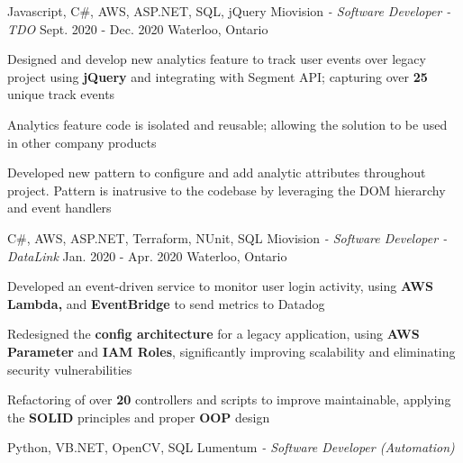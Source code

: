 \begin{siderules}
  \begin{cventries}
    \cventry
    {Javascript, C\#, AWS, ASP.NET, SQL, jQuery}
    {Miovision\hspace{0.15em} \bodyfontlight\itshape{- Software Developer - TDO}}
    {Sept. 2020 - Dec. 2020}
    {Waterloo, Ontario}
    {
      \begin{cvitems}
        \item {Designed and develop new analytics feature to track user events over legacy project using \textbf{jQuery} and integrating with Segment API; capturing over \textbf{25} unique track events}
        \item {Analytics feature code is isolated and reusable; allowing the solution to be used in other company products}
        \item {Developed new pattern to configure and add analytic attributes throughout project. Pattern is inatrusive to the codebase by leveraging the DOM hierarchy and event handlers}
      \end{cvitems}
    }
    \cventry
    {C\#, AWS, ASP.NET, Terraform, NUnit, SQL}
    {Miovision\hspace{0.15em} \bodyfontlight\itshape{- Software Developer - DataLink}}
    {Jan. 2020 - Apr. 2020}
    {Waterloo, Ontario}
    {
      \begin{cvitems}
        \item {Developed an event-driven service to monitor user login activity, using \textbf{AWS Lambda,} and \textbf{EventBridge} to send metrics to Datadog}
        \item {Redesigned the \textbf{config architecture} for a legacy application, using \textbf{AWS Parameter} and \textbf{IAM Roles}, significantly improving scalability and eliminating security vulnerabilities}
        \item {Refactoring of over \textbf{20} controllers and scripts to improve maintainable, applying the \textbf{SOLID} principles and proper \textbf{OOP} design}
      \end{cvitems}
    }
    \cventry
      {Python, VB.NET, OpenCV, SQL}
      {Lumentum\hspace{0.15em} \bodyfontlight\itshape{- Software Developer (Automation)}}

\end{cventries}
\end{siderules}
